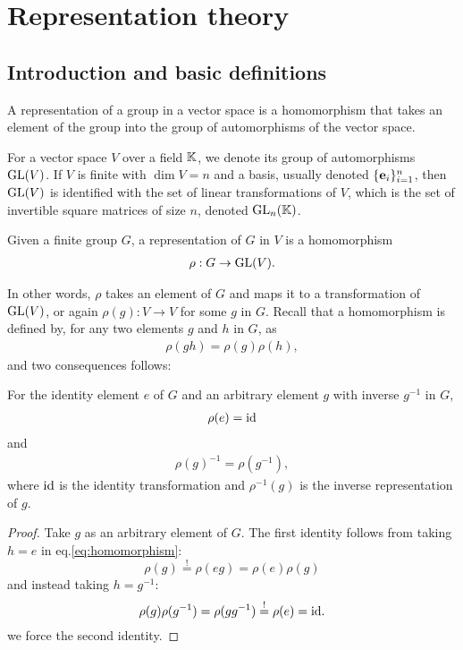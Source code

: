 \clearpage{\thispagestyle{empty}}
\section{Representation theory}

	\subsection{Introduction and basic definitions}
	
	A representation of a group in a vector space is a homomorphism that takes an element of the group into the group of automorphisms of the vector space. 
	
	For a vector space $V$ over a field $\mathbb{K}$, we denote its group of automorphisms $\text{GL}(V)$. If $V$ is finite with $\dim V = n$ and a basis, usually denoted $\{\mathbf{e}_i\}_{i=1}^n$, then $\text{GL}(V)$ is identified with the set of linear transformations of $V$, which is the set of invertible square matrices of size $n$, denoted $\text{GL}_n(\mathbb{K})$\cite[18.1]{DummitFoote}. 
	\begin{definition}[Representation]
		Given a finite group $G$, a representation of $G$ in $V$ is a homomorphism
		\begin{align}
			\rho: G \rightarrow \text{GL}(V).
		\end{align}
	\end{definition}
	In other words, $\rho$ takes an element of $G$ and maps it to a transformation of $\text{GL}(V)$, or again $\rho(g): V \rightarrow V$ for some $g$ in $G$.	Recall that a homomorphism is defined by, for any two elements $g$ and $h$ in $G$, as
	\begin{align}\label{eq:homomorphism}
		\rho(gh) = \rho(g)\rho(h),
	\end{align}
	and two consequences follows:	
	\begin{proposition}
		For the identity element $e$ of $G$ and an arbitrary element $g$ with inverse $g^{-1}$ in $G$,
		\begin{align}
			\rho(e) = \text{id}
		\end{align}
		and
		\begin{align}
			\rho(g)^{-1} = \rho\left(g^{-1}\right),
		\end{align}
		where $\text{id}$ is the identity transformation and $\rho^{-1}(g)$ is the inverse representation of $g$.
	\end{proposition}
	\begin{proof}
		Take $g$ as an arbitrary element of $G$. The first identity follows from taking $h=e$ in eq.\ref{eq:homomorphism}:
		\[
			\rho(g) \overset{!}{=} \rho(eg) = \rho(e)\rho(g)
		\]
		and instead taking $h=g^{-1}$:
		\[
			\rho(g) \rho(g^{-1}) =  \rho(gg^{-1}) \overset{!}{=} \rho(e) = \text{id}.
		\]
		we force the second identity.
	\end{proof}
	
